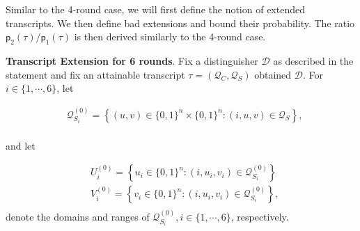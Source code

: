 Similar to the 4-round case, we will first define the notion of extended transcripts. We then define bad extensions and bound their probability. The ratio $\mathsf{p}_{2}(\tau)/\mathsf{p}_{1}(\tau)$ is then derived similarly to the 4-round case.



\arrangespace

\noindent \textbf{Transcript Extension for 6 rounds}.
Fix a distinguisher $\mathcal{D}$ as described in the statement and fix an attainable transcript $\tau =\left(\mathcal{Q}_{C}, \mathcal{Q}_{S}\right)$ obtained $\mathcal{D}$. For $i \in \{1, \cdots, 6\}$, let

$$
\begin{aligned}
&\mathcal{Q}_{S_{i}}^{(0)}=\left\{(u, v) \in\{0,1\}^{n} \times\{0,1\}^{n}:(i, u, v) \in \mathcal{Q}_{S} \right\},\\
\end{aligned}
$$

\noindent and let

$$
\begin{aligned}
&U_{i}^{(0)}=\left\{u_{i} \in\{0,1\}^{n}:\left(i, u_{i}, v_{i}\right) \in \mathcal{Q}_{S_{i}}^{(0)}\right\}\\
&V_{i}^{(0)}=\left\{v_{i} \in\{0,1\}^{n}:\left(i, u_{i}, v_{i}\right) \in \mathcal{Q}_{S_{i}}^{(0)}\right\},\\
\end{aligned}
$$
%
denote the domains and ranges of $\mathcal{Q}_{S_{i}}^{(0)}, i \in \{1, \cdots, 6\}$, respectively.









